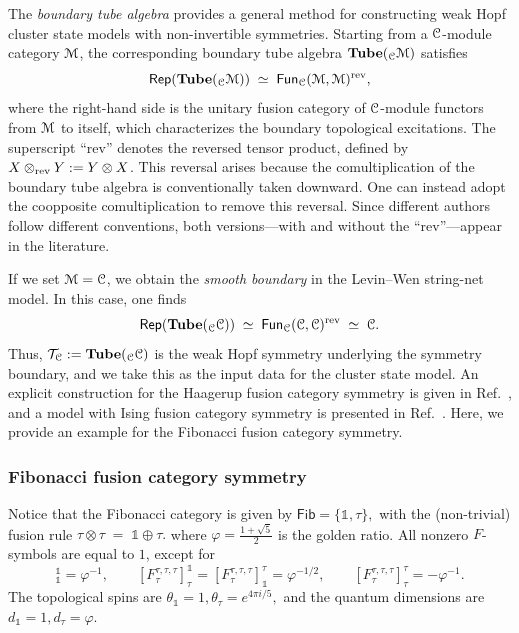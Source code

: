 \documentclass[a4paper,11pt]{article}
\theoremstyle{theorem}
\theoremstyle{remark}
\newcommand\eC           {\EuScript{C}}
\newcommand\eM          {\EuScript{M}}
\newcommand{\one}{\mathbb{1}}
\newcommand{\Rep}{\mathsf{Rep}}
\newcommand{\Fun}{\mathsf{Fun}}
\begin{document}
The \emph{boundary tube algebra} provides a general method for constructing weak Hopf cluster state models with non-invertible symmetries.  
Starting from a $\eC$-module category $\eM$, the corresponding boundary tube algebra $\mathbf{Tube}({_{\eC}}\eM)$ satisfies  
\begin{equation}
    \Rep\!\left(\mathbf{Tube}({_{\eC}}\eM)\right) \;\simeq\; \Fun_{\eC}(\eM,\eM)^{\rm rev},
\end{equation}
where the right-hand side is the unitary fusion category of $\eC$-module functors from $\eM$ to itself, which characterizes the boundary topological excitations.  
The superscript ``rev'' denotes the reversed tensor product, defined by $X \otimes_{\rm rev} Y := Y \otimes X$.  
This reversal arises because the comultiplication of the boundary tube algebra is conventionally taken downward.  
One can instead adopt the coopposite comultiplication to remove this reversal.  
Since different authors follow different conventions, both versions---with and without the ``rev''---appear in the literature.  


If we set $\eM=\eC$, we obtain the \emph{smooth boundary} in the Levin--Wen string-net model.  
In this case, one finds
\begin{equation}
    \Rep\!\left(\mathbf{Tube}({_{\eC}}\eC)\right) 
    \;\simeq\; \Fun_{\eC}(\eC,\eC)^{\rm rev} 
    \;\simeq\; \eC.
\end{equation}
Thus, 
\(
    \mathcal{T}_{\eC} := \mathbf{Tube}({_{\eC}}\eC)
\)
is the weak Hopf symmetry underlying the symmetry boundary, and we take this as the input data for the cluster state model.  
An explicit construction for the Haagerup fusion category symmetry is given in Ref.~\cite{jia2024quantumclusterstatemodel}, and a model with Ising fusion category symmetry is presented in Ref.~\cite{jia2025Ising}.  
Here, we provide an example for the Fibonacci fusion category symmetry.



\subsubsection{Fibonacci fusion category symmetry}

Notice that the Fibonacci category is given by 
\(
\mathsf{Fib}=\{\one,\tau\},
\) 
with the (non-trivial) fusion rule
\(
\tau \otimes \tau \;=\; \one \oplus \tau.
\)   
where $\varphi=\frac{1+\sqrt{5}}{2}$ is the golden ratio.
All nonzero $F$-symbols are equal to $1$, except for
\begin{equation}
   [F^{\tau,\tau,\tau}_{\tau}]_{\one}^{\one}=\varphi^{-1}, 
\qquad 
[F^{\tau,\tau,\tau}_{\tau}]_{\tau}^{\one}
= [F^{\tau,\tau,\tau}_{\tau}]_{\one}^{\tau} = \varphi^{-1/2}, 
\qquad 
[F^{\tau,\tau,\tau}_{\tau}]_{\tau}^{\tau}=-\varphi^{-1}. 
\end{equation}
The topological spins are 
\(
\theta_{\one}=1, \theta_{\tau}=e^{4\pi i/5},
\) 
and the quantum dimensions are 
\(
d_{\one}=1, d_{\tau}=\varphi.
\) 
\end{document}
